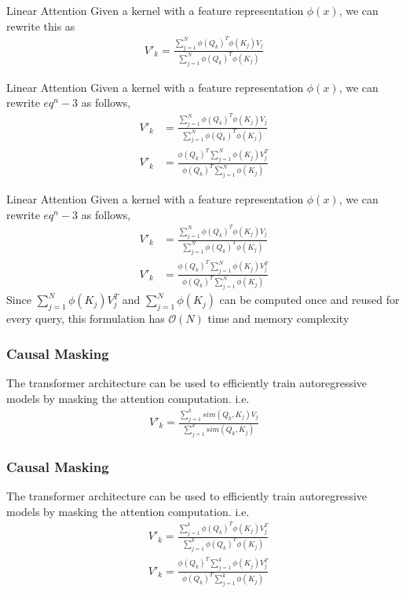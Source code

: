 \documentclass{beamer}
\begin{document}
    \begin{frame}{Linear Attention}
    Given a kernel with a feature representation $\phi(x)$, we can rewrite this as
    \begin{align*}
        V'_k=\frac{\sum_{j=1}^{N}\phi(Q_k)^T\phi(K_j)V_j}{\sum_{j=1}^{N}\phi(Q_k)^T\phi(K_j)} 
    \end{align*}
        
    \end{frame}
    \begin{frame}{Linear Attention}
    Given a kernel with a feature representation $\phi(x)$, we can rewrite $eq^n-3$ as follows,
    \begin{align*}
        V'_k&=\frac{\sum_{j=1}^{N}\phi(Q_k)^T\phi(K_j)V_j}{\sum_{j=1}^{N}\phi(Q_k)^T\phi(K_j)} \\
        V'_k&=\frac{\phi(Q_k)^T\sum_{j=1}^{N}\phi(K_j)V_j^T}{\phi(Q_k)^T\sum_{j=1}^{N}\phi(K_j)}
    \end{align*}
        
    \end{frame}
    \begin{frame}{Linear Attention}
    Given a kernel with a feature representation $\phi(x)$, we can rewrite $eq^n-3$ as follows,
    \begin{align*}
        V'_k&=\frac{\sum_{j=1}^{N}\phi(Q_k)^T\phi(K_j)V_j}{\sum_{j=1}^{N}\phi(Q_k)^T\phi(K_j)} \\
        V'_k&=\frac{\phi(Q_k)^T\sum_{j=1}^{N}\phi(K_j)V_j^T}{\phi(Q_k)^T\sum_{j=1}^{N}\phi(K_j)}
    \end{align*}
    Since $\sum_{j=1}^N \phi(K_j)V_j^T$ and $\sum_{j=1}^N \phi(K_j)$ can be computed once and reused for every query, this formulation has $\mathcal{O}(N)$ time and memory complexity
    \end{frame}
    \begin{frame}
    \frametitle{Causal Masking}
    The transformer architecture can be used to efficiently train autoregressive models by masking the attention computation. 
    i.e.
    \begin{align*}
        V'_k=\frac{\sum_{j=1}^{k}sim(Q_k,K_j)V_j}{\sum_{j=1}^{k}sim(Q_k,K_j)}
    \end{align*}    
    \end{frame}
        \begin{frame}
    \frametitle{Causal Masking}
    The transformer architecture can be used to efficiently train autoregressive models by masking the attention computation. 
    i.e.
    \begin{align*}
        &V'_k=\frac{\sum_{j=1}^{k}\phi(Q_k)^T\phi(K_j)V_j^T}{\sum_{j=1}^{k}\phi(Q_k)^T\phi(K_j)}\\
        &V'_k=\frac{\phi(Q_k)^T\sum_{j=1}^{k}\phi(K_j)V_j^T}{\phi(Q_k)^T\sum_{j=1}^{k}\phi(K_j)}
    \end{align*}    
    \end{frame}
\end{document}
